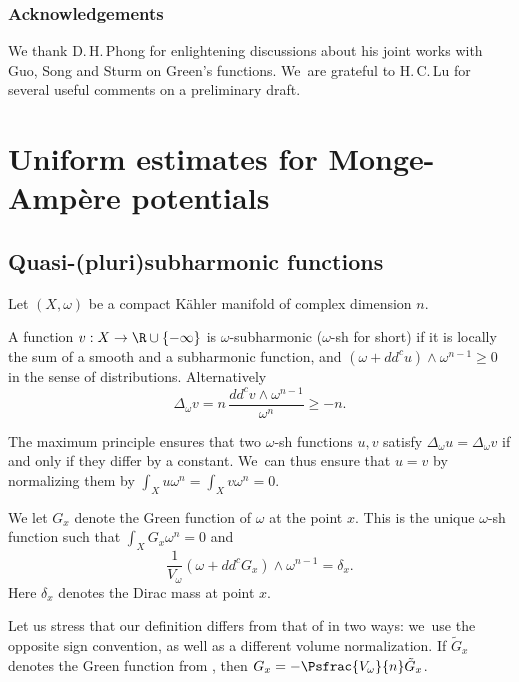 \subsubsection*{Acknowledgements}
We thank D.\,H.\,Phong for enlightening discussions about his joint works with Guo, Song and Sturm on Green's functions. We~are grateful to H.\,C.\,Lu for several useful comments on a preliminary draft.

\section{Uniform estimates for Monge-Ampère potentials}

\subsection{Quasi-(pluri)subharmonic functions}

Let $(X, \omega)$ be a compact Kähler manifold of complex dimension $n$.


\begin{defi}
A function $v:X \rightarrow \R \cup \{-\infty\}$
is $\omega$-subharmonic ($\omega$-sh for short) if it is locally the sum of a smooth and a subharmonic function, and
$(\omega+dd^c u) \wedge \omega^{n-1} \geq 0$ in the sense of distributions.
Alternatively
\[
\Delta_{\omega} v=n\, \frac{dd^c v \wedge \omega^{n-1}}{\omega^n} \geq -n.
\]
\end{defi}

The maximum principle ensures that two $\omega$-sh functions $u,v$ satisfy $\Delta_{\omega} u=\Delta_{\omega} v$ if and only if they differ by a constant. We~can thus ensure that $u=v$ by normalizing them
by $\int_X u \omega^n=\int_X v \omega^n=0$.

\begin{defi} \label{def:green}
We let $G_x$ denote the Green function of $\omega$ at the point $x$.
This is the unique $\omega$-sh function such that $\int_X G_x \omega^n=0$ and
\[
\frac{1}{V_{\omega}} (\omega+dd^c G_x) \wedge \omega^{n-1}=\delta_x.
\]
Here $\delta_x$ denotes the Dirac mass at point $x$.
\end{defi}

Let us stress that our definition differs from that
of \cite{GPSS22} in two ways: we~use the opposite sign convention, as well as a different volume normalization.
If $\tilde{G}_x$ denotes the Green function from \cite{GPSS22}, then
$G_x=-\Psfrac{V_{\omega}}{n}\tilde{G}_x$.

